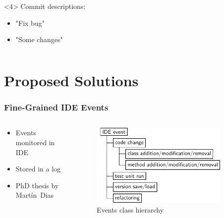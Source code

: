\documentclass[aspectratio=169]{beamer}
\begin{document}
\begin{frame}[fragile]
\begin{columns}
\begin{column}{0.5\textwidth}
\begin{onlyenv}<4>
  Commit descriptions:
  \begin{itemize}
  \item "Fix bug"
  \item "Some changes"
  \end{itemize}
\end{onlyenv}

\end{column}

\end{columns}

\end{frame}

\section{Proposed Solutions}

\begin{frame}[fragile]

\frametitle{Fine-Grained IDE Events}

\begin{columns}

\begin{column}{0.5\textwidth}

\begin{itemize}
\item Events monitored in IDE
\item Stored in a log
\item PhD thesis by Mart\'{i}n~Dias
\end{itemize}
\end{column}

\begin{column}{0.5\textwidth}

\begin{figure}
\begin{center}
\includegraphics[width=0.9\textwidth]{img/events_model_diagram.pdf}
\end{center}
\caption{Events class hierarchy}
\end{figure}

\end{column}

\end{columns}

\end{frame}
\end{document}
